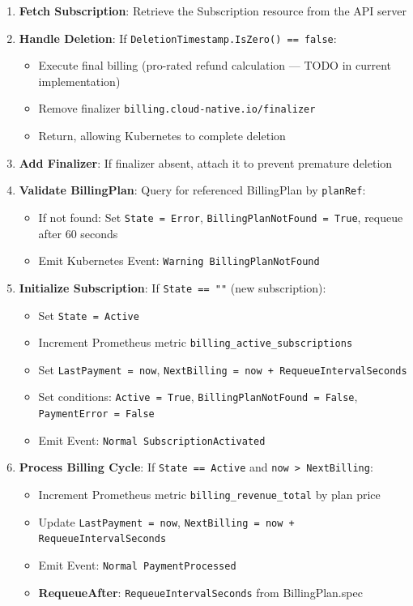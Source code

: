 \begin{enumerate}
    \item \textbf{Fetch Subscription}: Retrieve the Subscription resource from the API server
    \item \textbf{Handle Deletion}: If \texttt{DeletionTimestamp.IsZero() == false}:
    \begin{itemize}
        \item Execute final billing (pro-rated refund calculation --- TODO in current implementation)
        \item Remove finalizer \texttt{billing.cloud-native.io/finalizer}
        \item Return, allowing Kubernetes to complete deletion
    \end{itemize}
    \item \textbf{Add Finalizer}: If finalizer absent, attach it to prevent premature deletion
    \item \textbf{Validate BillingPlan}: Query for referenced BillingPlan by \texttt{planRef}:
    \begin{itemize}
        \item If not found: Set \texttt{State = Error}, \texttt{BillingPlanNotFound = True}, requeue after 60 seconds
        \item Emit Kubernetes Event: \texttt{Warning BillingPlanNotFound}
    \end{itemize}
    \item \textbf{Initialize Subscription}: If \texttt{State == ""} (new subscription):
    \begin{itemize}
        \item Set \texttt{State = Active}
        \item Increment Prometheus metric \texttt{billing\_active\_subscriptions}
        \item Set \texttt{LastPayment = now}, \texttt{NextBilling = now + RequeueIntervalSeconds}
        \item Set conditions: \texttt{Active = True}, \texttt{BillingPlanNotFound = False}, \texttt{PaymentError = False}
        \item Emit Event: \texttt{Normal SubscriptionActivated}
    \end{itemize}
    \item \textbf{Process Billing Cycle}: If \texttt{State == Active} and \texttt{now > NextBilling}:
    \begin{itemize}
        \item Increment Prometheus metric \texttt{billing\_revenue\_total} by plan price
        \item Update \texttt{LastPayment = now}, \texttt{NextBilling = now + RequeueIntervalSeconds}
        \item Emit Event: \texttt{Normal PaymentProcessed}
        \item \textbf{RequeueAfter}: \texttt{RequeueIntervalSeconds} from BillingPlan.spec
    \end{itemize}
\end{enumerate}


